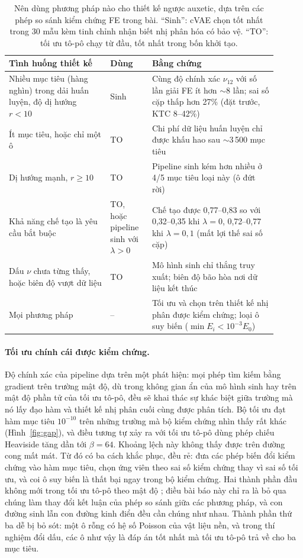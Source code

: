 \documentclass[a4paper,11pt]{article}
\newcommand{\nuot}{\nu_{12}}
\begin{document}
\begin{table}[t]
\centering
\caption{Nên dùng phương pháp nào cho thiết kế ngược auxetic, dựa trên các
phép so sánh kiểm chứng FE trong bài. ``Sinh'': cVAE chọn tốt nhất trong 30
mẫu kèm tinh chỉnh nhận biết nhị phân hóa có bảo vệ. ``TO'': tối ưu tô-pô
chạy từ đầu, tốt nhất trong bốn khởi tạo.}
\label{tab:choice}
\small
\begin{tabular}{p{0.34\linewidth}p{0.14\linewidth}p{0.42\linewidth}}
\toprule
Tình huống thiết kế & Dùng & Bằng chứng\\
\midrule
Nhiều mục tiêu (hàng nghìn) trong dải huấn luyện, độ dị hướng $r<10$
  & Sinh & Cùng độ chính xác $\nuot$ với số lần giải FE ít hơn
  $\sim$8 lần; sai số cặp thấp hơn 27\% (đặt trước, KTC 8--42\%)\\
Ít mục tiêu, hoặc chỉ một ô
  & TO & Chi phí dữ liệu huấn luyện chỉ được khấu hao sau
  $\sim$3\,500 mục tiêu\\
Dị hướng mạnh, $r\ge10$
  & TO & Pipeline sinh kém hơn nhiều ở 4/5 mục tiêu loại này
  (ô đứt rời)\\
Khả năng chế tạo là yêu cầu bắt buộc
  & TO, hoặc pipeline sinh với $\lambda>0$ & Chế tạo được 0,77--0,83 so với
  0,32--0,35 khi $\lambda=0$, 0,72--0,77 khi $\lambda=0{,}1$ (mất lợi thế sai
  số cặp)\\
Dấu $\nu$ chưa từng thấy, hoặc biên độ vượt dữ liệu
  & TO & Mô hình sinh chỉ thắng truy xuất; biên độ bão hòa nơi dữ liệu
  kết thúc\\
Mọi phương pháp
  & -- & Tối ưu và chọn trên thiết kế nhị phân được kiểm chứng; loại ô suy
  biến ($\min E_i<10^{-3}E_0$)\\
\bottomrule
\end{tabular}
\end{table}

\paragraph{Tối ưu chính cái được kiểm chứng.}
Độ chính xác của pipeline dựa trên một phát hiện: mọi phép tìm kiếm bằng
gradient trên trường mật độ, dù trong không gian ẩn của mô hình sinh hay trên
mật độ phần tử của tối ưu tô-pô, đều sẽ khai thác sự khác biệt giữa trường mà
nó lấy đạo hàm và thiết kế nhị phân cuối cùng được phân tích. Bộ tối ưu đạt
hàm mục tiêu $10^{-10}$ trên những trường mà bộ kiểm chứng nhìn thấy rất khác
(Hình~\ref{fig:gap}), và điều tương tự xảy ra với tối ưu tô-pô dùng phép
chiếu Heaviside tăng dần tới $\beta=64$. Khoảng lệch này không thấy được trên
đường cong mất mát. Từ đó có ba cách khắc phục, đều rẻ: đưa các phép biến đổi
kiểm chứng vào hàm mục tiêu, chọn ứng viên theo sai số kiểm chứng thay vì sai
số tối ưu, và coi ô suy biến là thất bại ngay trong bộ kiểm chứng. Hai thành
phần đầu không mới trong tối ưu tô-pô theo mật độ
\citep{guest2004achieving,wang2011projection}; điều bài báo này chỉ ra là bỏ
qua chúng làm thay đổi kết luận của phép so sánh giữa các phương pháp, và con
đường sinh lẫn con đường kinh điển đều cần chúng như nhau. Thành phần thứ ba
dễ bị bỏ sót: một ô rỗng có hệ số Poisson của vật liệu nền, và trong thí
nghiệm đổi dấu, các ô như vậy là đáp án tốt nhất mà tối ưu tô-pô trả về cho
ba mục tiêu.
\end{document}
